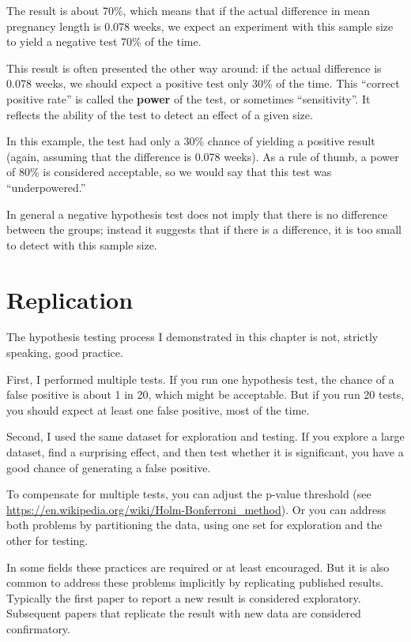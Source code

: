 \documentclass[12pt]{book}
\begin{document}
The result is about 70\%, which means that if the actual difference in
mean pregnancy length is 0.078 weeks, we expect an experiment with this
sample size to yield a negative test 70\% of the time.

This result is often presented the other way around: if the actual
difference is 0.078 weeks, we should expect a positive test only 30\%
of the time.  This ``correct positive rate'' is called the {\bf power}
of the test, or sometimes ``sensitivity''.  It reflects the ability of
the test to detect an effect of a given size.

In this example, the test had only a 30\% chance of yielding a
positive result (again, assuming that the difference is 0.078 weeks).
As a rule of thumb, a power of 80\% is considered acceptable, so
we would say that this test was ``underpowered.''

In general a negative hypothesis test does not imply that there is no
difference between the groups; instead it suggests that if there is a
difference, it is too small to detect with this sample size.


\section{Replication}
\label{replication}

The hypothesis testing process I demonstrated in this chapter is not,
strictly speaking, good practice.

First, I performed multiple tests.  If you run one hypothesis test,
the chance of a false positive is about 1 in 20, which might be
acceptable.  But if you run 20 tests, you should expect at least one
false positive, most of the time.

Second, I used the same dataset for exploration and testing.  If
you explore a large dataset, find a surprising effect, and then test
whether it is significant, you have a good chance of generating a
false positive.
 

To compensate for multiple tests, you can adjust the p-value
threshold (see
  \url{https://en.wikipedia.org/wiki/Holm-Bonferroni_method}).  Or you
can address both problems by partitioning the data, using one set for
exploration and the other for testing.

In some fields these practices are required or at least encouraged.
But it is also common to address these problems implicitly by
replicating published results.  Typically the first paper to report a
new result is considered exploratory.  Subsequent papers that
replicate the result with new data are considered confirmatory.
\end{document}

